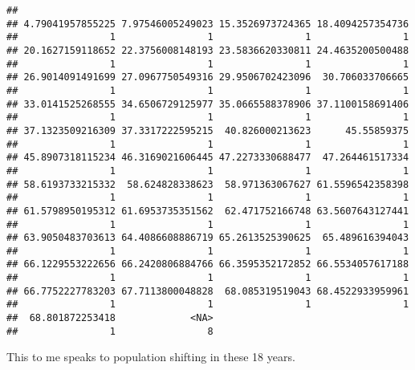 \documentclass[
]{article}
\begin{document}
\begin{verbatim}
## 
## 4.79041957855225 7.97546005249023 15.3526973724365 18.4094257354736 
##                1                1                1                1 
## 20.1627159118652 22.3756008148193 23.5836620330811 24.4635200500488 
##                1                1                1                1 
## 26.9014091491699 27.0967750549316 29.9506702423096  30.706033706665 
##                1                1                1                1 
## 33.0141525268555 34.6506729125977 35.0665588378906 37.1100158691406 
##                1                1                1                1 
## 37.1323509216309 37.3317222595215  40.826000213623      45.55859375 
##                1                1                1                1 
## 45.8907318115234 46.3169021606445 47.2273330688477  47.264461517334 
##                1                1                1                1 
## 58.6193733215332  58.624828338623  58.971363067627 61.5596542358398 
##                1                1                1                1 
## 61.5798950195312 61.6953735351562  62.471752166748 63.5607643127441 
##                1                1                1                1 
## 63.9050483703613 64.4086608886719 65.2613525390625  65.489616394043 
##                1                1                1                1 
## 66.1229553222656 66.2420806884766 66.3595352172852 66.5534057617188 
##                1                1                1                1 
## 66.7752227783203 67.7113800048828  68.085319519043 68.4522933959961 
##                1                1                1                1 
##  68.801872253418             <NA> 
##                1                8
\end{verbatim}

This to me speaks to population shifting in these 18 years.
\end{document}
